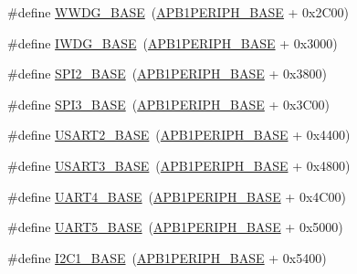 \begin{DoxyCompactItemize}
\item 
\#define \hyperlink{group___peripheral__memory__map_ga9a5bf4728ab93dea5b569f5b972cbe62}{W\+W\+D\+G\+\_\+\+B\+A\+SE}~(\hyperlink{group___peripheral__memory__map_ga45666d911f39addd4c8c0a0ac3388cfb}{A\+P\+B1\+P\+E\+R\+I\+P\+H\+\_\+\+B\+A\+SE} + 0x2\+C00)
\item 
\#define \hyperlink{group___peripheral__memory__map_ga8543ee4997296af5536b007cd4748f55}{I\+W\+D\+G\+\_\+\+B\+A\+SE}~(\hyperlink{group___peripheral__memory__map_ga45666d911f39addd4c8c0a0ac3388cfb}{A\+P\+B1\+P\+E\+R\+I\+P\+H\+\_\+\+B\+A\+SE} + 0x3000)
\item 
\#define \hyperlink{group___peripheral__memory__map_gac3e357b4c25106ed375fb1affab6bb86}{S\+P\+I2\+\_\+\+B\+A\+SE}~(\hyperlink{group___peripheral__memory__map_ga45666d911f39addd4c8c0a0ac3388cfb}{A\+P\+B1\+P\+E\+R\+I\+P\+H\+\_\+\+B\+A\+SE} + 0x3800)
\item 
\#define \hyperlink{group___peripheral__memory__map_gae634fe8faa6922690e90fbec2fc86162}{S\+P\+I3\+\_\+\+B\+A\+SE}~(\hyperlink{group___peripheral__memory__map_ga45666d911f39addd4c8c0a0ac3388cfb}{A\+P\+B1\+P\+E\+R\+I\+P\+H\+\_\+\+B\+A\+SE} + 0x3\+C00)
\item 
\#define \hyperlink{group___peripheral__memory__map_gade83162a04bca0b15b39018a8e8ec090}{U\+S\+A\+R\+T2\+\_\+\+B\+A\+SE}~(\hyperlink{group___peripheral__memory__map_ga45666d911f39addd4c8c0a0ac3388cfb}{A\+P\+B1\+P\+E\+R\+I\+P\+H\+\_\+\+B\+A\+SE} + 0x4400)
\item 
\#define \hyperlink{group___peripheral__memory__map_gabe0d6539ac0026d598274ee7f45b0251}{U\+S\+A\+R\+T3\+\_\+\+B\+A\+SE}~(\hyperlink{group___peripheral__memory__map_ga45666d911f39addd4c8c0a0ac3388cfb}{A\+P\+B1\+P\+E\+R\+I\+P\+H\+\_\+\+B\+A\+SE} + 0x4800)
\item 
\#define \hyperlink{group___peripheral__memory__map_ga94d92270bf587ccdc3a37a5bb5d20467}{U\+A\+R\+T4\+\_\+\+B\+A\+SE}~(\hyperlink{group___peripheral__memory__map_ga45666d911f39addd4c8c0a0ac3388cfb}{A\+P\+B1\+P\+E\+R\+I\+P\+H\+\_\+\+B\+A\+SE} + 0x4\+C00)
\item 
\#define \hyperlink{group___peripheral__memory__map_gaa155689c0e206e6994951dc3cf31052a}{U\+A\+R\+T5\+\_\+\+B\+A\+SE}~(\hyperlink{group___peripheral__memory__map_ga45666d911f39addd4c8c0a0ac3388cfb}{A\+P\+B1\+P\+E\+R\+I\+P\+H\+\_\+\+B\+A\+SE} + 0x5000)
\item 
\#define \hyperlink{group___peripheral__memory__map_gacd72dbffb1738ca87c838545c4eb85a3}{I2\+C1\+\_\+\+B\+A\+SE}~(\hyperlink{group___peripheral__memory__map_ga45666d911f39addd4c8c0a0ac3388cfb}{A\+P\+B1\+P\+E\+R\+I\+P\+H\+\_\+\+B\+A\+SE} + 0x5400)

\end{DoxyCompactItemize}
